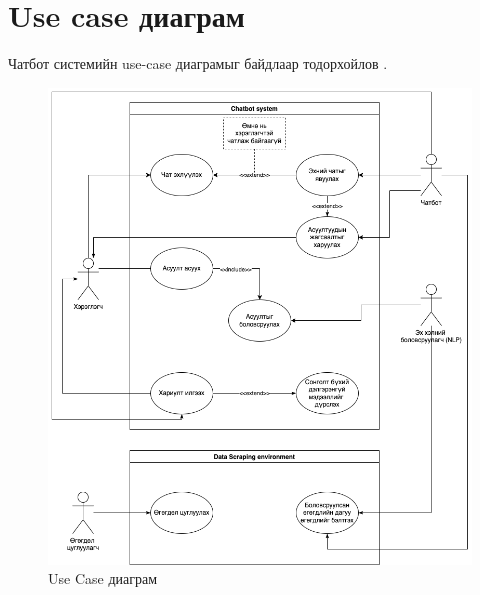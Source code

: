 \section{Use case диаграм}
Чатбот системийн use-case диаграмыг байдлаар тодорхойлов \cite{useCase}.
\begin{figure}[ht]
  \centering
  \includegraphics[width=\textwidth-2.2cm]{images/useCase.png}
  \caption{Use Case диаграм}\label{fig:useCase}
\end{figure}
